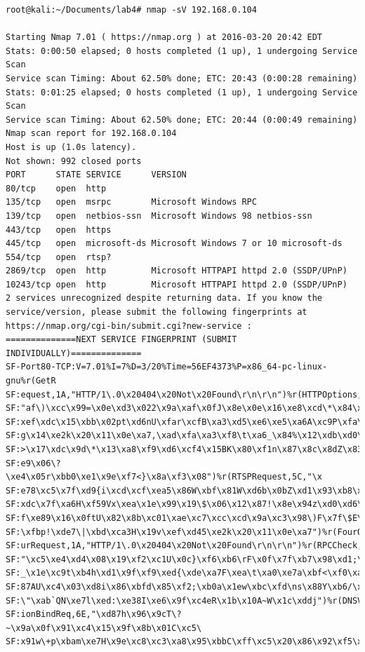 \documentclass[12pt,a4paper]{report}
\begin{document}
\begin{lstlisting}[breaklines]
root@kali:~/Documents/lab4# nmap -sV 192.168.0.104

Starting Nmap 7.01 ( https://nmap.org ) at 2016-03-20 20:42 EDT
Stats: 0:00:50 elapsed; 0 hosts completed (1 up), 1 undergoing Service Scan
Service scan Timing: About 62.50% done; ETC: 20:43 (0:00:28 remaining)
Stats: 0:01:25 elapsed; 0 hosts completed (1 up), 1 undergoing Service Scan
Service scan Timing: About 62.50% done; ETC: 20:44 (0:00:49 remaining)
Nmap scan report for 192.168.0.104
Host is up (1.0s latency).
Not shown: 992 closed ports
PORT      STATE SERVICE      VERSION
80/tcp    open  http
135/tcp   open  msrpc        Microsoft Windows RPC
139/tcp   open  netbios-ssn  Microsoft Windows 98 netbios-ssn
443/tcp   open  https
445/tcp   open  microsoft-ds Microsoft Windows 7 or 10 microsoft-ds
554/tcp   open  rtsp?
2869/tcp  open  http         Microsoft HTTPAPI httpd 2.0 (SSDP/UPnP)
10243/tcp open  http         Microsoft HTTPAPI httpd 2.0 (SSDP/UPnP)
2 services unrecognized despite returning data. If you know the service/version, please submit the following fingerprints at https://nmap.org/cgi-bin/submit.cgi?new-service :
==============NEXT SERVICE FINGERPRINT (SUBMIT INDIVIDUALLY)==============
SF-Port80-TCP:V=7.01%I=7%D=3/20%Time=56EF4373%P=x86_64-pc-linux-gnu%r(GetR
SF:equest,1A,"HTTP/1\.0\x20404\x20Not\x20Found\r\n\r\n")%r(HTTPOptions,6B,
SF:"af\)\xcc\x99=\x0e\xd3\x022\x9a\xaf\x0fJ\x8e\x0e\x16\xe8\xcd\*\x84\xec\
SF:xef\xdc\x15\xbb\x02pt\xd6nU\xfar\xcfB\xa3\xd5\xe6\xe5\xa6A\xc9P\xfa\xb5
SF:g\x14\xe2k\x20\x11\x0e\xa7,\xad\xfa\xa3\xf8\t\xa6_\x84%\x12\xdb\xd0\x01
SF:>\x17\xdc\x9d\*\x13\xa8\xf9\xd6\xcf4\x15BK\x80\xf1n\x87\x8c\x8dZ\x83X\x
SF:e9\x06\?\xe4\x05r\xbb0\xe1\x9e\xf7<}\x8a\xf3\x08")%r(RTSPRequest,5C,"\x
SF:e78\xc5\x7f\xd9{i\xcd\xcf\xea5\x86W\xbf\x81W\xd6b\x0bZ\xd1\x93\xb8\x20\
SF:xdc\x7f\xa6H\xf59Vx\xea\x1e\x99\x19\$\x06\x12\x87!\x8e\x94z\xd0\xd6\x7f
SF:f\xe89\x16\x0ftU\x82\x8b\xc01\xae\xc7\xcc\xcd\x9a\xc3\x98\)F\x7f\$E\xb2
SF:\xfbp!\xde7\|\xbd\xca3H\x19v\xef\xd45\xe2k\x20\x11\x0e\xa7")%r(FourOhFo
SF:urRequest,1A,"HTTP/1\.0\x20404\x20Not\x20Found\r\n\r\n")%r(RPCCheck,60,
SF:"\xc5\xe4\xd4\x08\x19\xf2\xc1U\x0c}\xf6\xb6\rF\x0f\x7f\xb7\x98\xd1;\xf7
SF:_\x1e\xc9t\xb4h\xd1\x9f\xf9\xed{\xde\xa7F\xea\t\xa0\xe7a\xbf<\xf0\xa8\x
SF:87AU\xc4\x03\xd8i\x86\xbfd\x85\xf2;\xb0a\x1ew\xbc\xfd\ns\x88Y\xb6/\x14u
SF:\"\xab`QN\xe7l\xed:\xe38I\xe6\x9f\xc4eR\x1b\x10A~W\x1c\xddj")%r(DNSVers
SF:ionBindReq,6E,"\xd87h\x96\x9cT\?~\x9a\x0f\x91\xc4\x15\x9f\x8b\x01C\xc5\
SF:x91w\+p\xbam\xe7H\x9e\xc8\xc3\xa8\x95\xbbC\xff\xc5\x20\x86\x92\xf5\x01\

\end{lstlisting}
\end{document}
